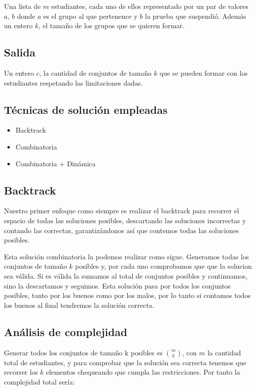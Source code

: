 \documentclass{article}
\begin{document}
Una lista de $m$ estudiantes, cada uno de ellos representado por un par de valores $a$, $b$ donde $a$ es el grupo al que pertenence y $b$ la prueba que suspendió. Además un entero $k$, el tamaño de los grupos que se quieren formar.

\subsection{Salida}

Un entero $c$, la cantidad de conjuntos de tamaño $k$ que se pueden formar con los estudiantes respetando las limitaciones dadas.

\subsection{Técnicas de solución empleadas}

\begin{itemize}
\item Backtrack
\item Combinatoria
\item Combinatoria + Dinámica
\end{itemize}

\subsection{Backtrack}

Nuestro primer enfoque como siempre es realizar el backtrack para recorrer el espacio de todas las soluciones posibles, descartando las soluciones incorrectas y contando las correctas, garantizándonos así que contemos todas las soluciones posibles.

Esta solución combinatoria la podemos realizar como sigue. Generamos todas los conjuntos de tamaño $k$ posibles y, por cada uno comprobamos que que la solucion sea válida. Si es válida la sumamos al total de conjuntos posibles y continuamos, sino la descartamos y seguimos. Esta solución pasa por todos los conjuntos posibles, tanto por los buenos como por los malos, por lo tanto si contamos todos los buenos al final tendremos la solución correcta.

\subsection{Análisis de complejidad}

Generar todos los conjuntos de tamaño k posibles es $m \choose k$, con $m$ la cantidad total de estudiantes, y para comprobar que la solución sea correcta tenemos que recorrer los $k$ elementos chequeando que cumpla las restricciones. Por tanto la complejidad total sería:
\end{document}
